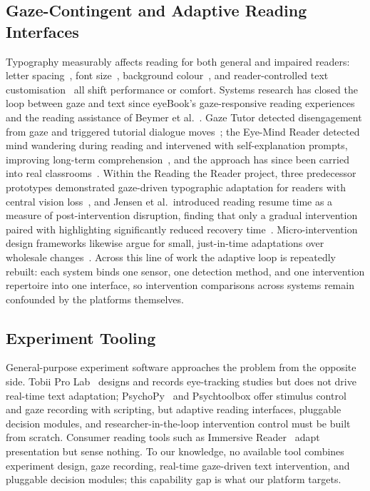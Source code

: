 \subsection{Gaze-Contingent and Adaptive Reading Interfaces}
Typography measurably affects reading for both general and impaired readers: letter spacing~\cite{beier2021letterspacing}, font size~\cite{rello2016makeitbig}, background colour~\cite{rello2017backgroundcolors}, and reader-controlled text customisation~\cite{arditi2004adjustable} all shift performance or comfort.
Systems research has closed the loop between gaze and text since eyeBook's gaze-responsive reading experiences and the reading assistance of Beymer et al.~\cite{beymer2008eyetracking}.
Gaze Tutor detected disengagement from gaze and triggered tutorial dialogue moves~\cite{dmello2012gazetutor}; the Eye-Mind Reader detected mind wandering during reading and intervened with self-explanation prompts, improving long-term comprehension~\cite{hutt2020eyemind}, and the approach has since been carried into real classrooms~\cite{hutt2021classrooms}.
Within the Reading the Reader project, three predecessor prototypes demonstrated gaze-driven typographic adaptation for readers with central vision loss~\cite{refsgaard2024rtr, pereira2024typography, palinec2024reactive}, and Jensen et al.\ introduced reading resume time as a measure of post-intervention disruption, finding that only a gradual intervention paired with highlighting significantly reduced recovery time~\cite{jensen2025context}.
Micro-intervention design frameworks likewise argue for small, just-in-time adaptations over wholesale changes~\cite{persson2025microintervention}.
Across this line of work the adaptive loop is repeatedly rebuilt: each system binds one sensor, one detection method, and one intervention repertoire into one interface, so intervention comparisons across systems remain confounded by the platforms themselves.

\subsection{Experiment Tooling}
General-purpose experiment software approaches the problem from the opposite side.
Tobii Pro Lab~\cite{tobii2025prolab} designs and records eye-tracking studies but does not drive real-time text adaptation; PsychoPy~\cite{peirce2019psychopy} and Psychtoolbox offer stimulus control and gaze recording with scripting, but adaptive reading interfaces, pluggable decision modules, and researcher-in-the-loop intervention control must be built from scratch.
Consumer reading tools such as Immersive Reader~\cite{microsoft2025immersive} adapt presentation but sense nothing.
To our knowledge, no available tool combines experiment design, gaze recording, real-time gaze-driven text intervention, and pluggable decision modules; this capability gap is what our platform targets.

